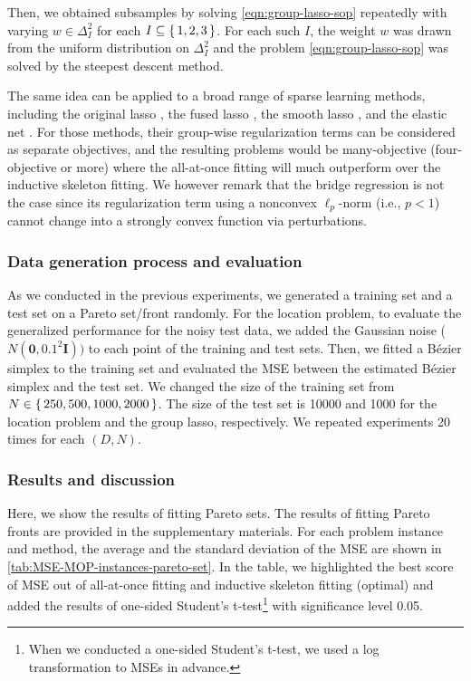 \documentclass[letterpaper]{article} %
\theoremstyle{plain}
\begin{document}
Then, we obtained subsamples by solving \cref{eqn:group-lasso-sop} repeatedly with varying $w \in \Delta^2_I$ for each $I \subseteq \set{1, 2, 3}$.
For each such $I$, the weight $w$ was drawn from the uniform distribution on $\Delta^2_I$ and the problem \cref{eqn:group-lasso-sop} was solved by the steepest descent method.

The same idea can be applied to a broad range of sparse learning methods, including the original lasso \cite{Tibshirani1996}, the fused lasso \cite{Tibshirani2005}, the smooth lasso \cite{Hebiri2011}, and the elastic net \cite{Zou2005}.
For those methods, their group-wise regularization terms can be considered as separate objectives, and the resulting problems would be many-objective (four-objective or more) where the all-at-once fitting will much outperform over the inductive skeleton fitting.
We however remark that the bridge regression \cite{Frank1993} is not the case since its regularization term using a nonconvex $\ell_p$-norm (i.e., $p < 1$) cannot change into a strongly convex function via perturbations.


\subsubsection{Data generation process and evaluation}
As we conducted in the previous experiments, we generated a training set and a test set on a Pareto set/front randomly.
For the location problem, to evaluate the generalized performance for the noisy test data, we added the Gaussian noise ($N(\bm 0, 0.1^2 \bm I))$ to each point of the training and test sets.
Then, we fitted a B\'ezier simplex to the training set and evaluated the MSE between the estimated B\'ezier simplex and the test set.
We changed the size of the training set from $N \in \set{250, 500, 1000, 2000}$.
The size of the test set is 10000 and 1000 for the location problem and the group lasso, respectively.
We repeated experiments 20 times for each $(D, N)$.


\subsubsection{Results and discussion}
Here, we show the results of fitting Pareto sets.
The results of fitting Pareto fronts are provided in the supplementary materials. %
For each problem instance and method, the average and the standard deviation of the MSE are shown in \cref{tab:MSE-MOP-instances-pareto-set}.
In the table, we highlighted the best score of MSE out of all-at-once fitting and inductive skeleton fitting (optimal) and added the results of one-sided Student's t-test\footnote{When we conducted a one-sided Student's t-test, we used a log transformation to MSEs in advance.} with significance level 0.05.
\end{document}
